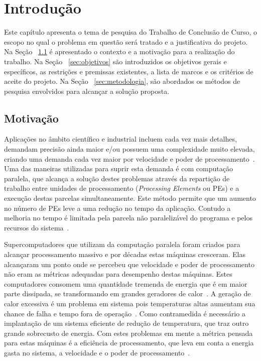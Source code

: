\documentclass[
	12pt,				%
	openright,			%
	twoside,			%
	a4paper,			%
	english,			%
	brazil,				%
	]{abntex2}
\begin{document}
\tableofcontents*
\cleardoublepage



\textual


\chapter{Introdução}

Este capítulo apresenta o tema de pesquisa do Trabalho de Conclusão de Curso, o escopo no qual o problema em questão será tratado e a justificativa do projeto. Na Seção ~\ref{sec:introducao} é apresentado o contexto e a motivação para a realização do trabalho. Na Seção ~\ref{sec:objetivos} são introduzidos os objetivos gerais e específicos, as restrições e premissas existentes, a lista de marcos e os critérios de aceite do projeto. Na Seção ~\ref{sec:metodologia}, são abordados os métodos de pesquisa envolvidos para alcançar a solução proposta.


\section{Motivação}
\label{sec:introducao}

Aplicações no âmbito científico e industrial incluem cada vez mais detalhes, demandam precisão ainda maior e/ou possuem uma complexidade muito elevada, criando uma demanda cada vez maior por velocidade e poder de processamento~\cite{pilla-thesis}. Uma das maneiras utilizadas para suprir esta demanda é com computação paralela, que alcança a solução destes problemas através da repartição de trabalho entre unidades de processamento (\textit{Processing Elements} ou PEs) e a execução destas parcelas simultaneamente. Este método permite que um aumento no número de PEs leve a uma redução no tempo da aplicação. Contudo a melhoria no tempo é limitada pela parcela não paralelizável do programa e pelos recursos do sistema~\cite{amdahl}. 

Supercomputadores que utilizam da computação paralela foram criados para alcançar processamento massivo e por décadas estas máquinas cresceram. Elas alcançaram um ponto onde se percebeu que velocidade e poder de processamento não eram as métricas adequadas para desempenho destas máquinas. Estes computadores consomem uma quantidade tremenda de energia que é em maior parte dissipada, se transformando em grandes geradores de calor~\cite{green500}. A geração de calor excessiva é um problema em sistema pois temperaturas altas aumentam sua chance de falha e tempo fora de operação~\cite{efficient-metric}. Como contramedida é necessário a implantação de um sistema eficiente de redução de temperatura, que traz outro grande sobrecusto de energia. Com estes problemas em mente a métrica pensada para estas máquinas é a eficiência de processamento, que leva em conta a energia gasta no sistema, a velocidade e o poder de processamento~\cite{efficient-metric}.
\end{document}
